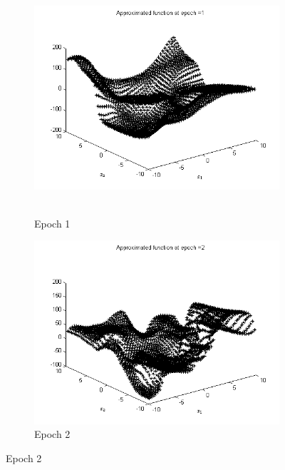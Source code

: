 \begin{figure}
\begin{subfigure}{.5\textwidth}
  \centering
  \includegraphics[width=.8\linewidth]{Regression/bivariate/2layers_epoch_1.png}\
  \caption{Epoch 1}
\end{subfigure}%
\begin{subfigure}{.5\textwidth}
  \centering
  \includegraphics[width=.8\linewidth]{Regression/bivariate/2layers_epoch_2.png}
   \caption{Epoch 2}
  \end{subfigure}
  

\end{figure}
